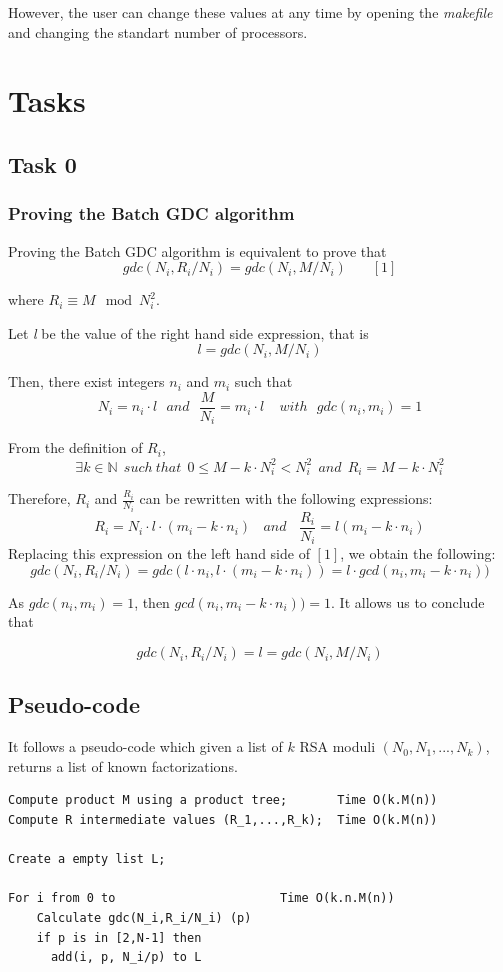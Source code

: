 \documentclass[a4paper,12pt]{article}
\begin{document}
However, the user can change these values at any time by opening the \textit{makefile} and changing the standart number of processors.

\section{Tasks}
\subsection{Task 0}

\subsubsection{Proving the Batch GDC algorithm}

Proving the Batch GDC algorithm is equivalent to prove that $$gdc(N_i,R_i/N_i) = gdc(N_i,M/N_i)~~~~~~~~[1]$$

where $R_i \equiv M\mod N_i^2$.

Let \textit{l} be the value of the right hand side expression, that is $$l = gdc(N_i,M/N_i)$$

Then, there exist integers $n_i$ and $m_i$ such that
$$N_i = n_i \cdot l ~~~ and~~~ \frac{M}{N_i} = m_i\cdot l ~~~~~ with~~~ gdc(n_i,m_i) = 1$$

From the definition of $R_i$,
$$ \exists k\in \mathbb{N} ~~such~ that~~ 0 \le M - k \cdot N_i^2 < N_i^2 ~~and ~~R_i = M - k \cdot N_i^2$$

Therefore, $R_i$ and $\frac{R_i}{N_i}$ can be rewritten with the following expressions:
$$ R_i = N_i \cdot l\cdot(m_i - k\cdot n_i) ~~~~ and ~~~~\frac{R_i}{N_i} = l(m_i- k\cdot n_i)$$
Replacing this expression on the left hand side of $[1]$, we obtain the following:
$$gdc(N_i,R_i/N_i) = gdc(l\cdot n_i, l\cdot(m_i - k\cdot n_i)) = l\cdot gcd(n_i,m_i-k\cdot n_i))$$

As $gdc(n_i,m_i) = 1$, then $gcd(n_i,m_i-k\cdot n_i)) = 1$. It allows us to conclude that

$$gdc(N_i,R_i/N_i) = l = gdc(N_i,M/N_i)$$

\subsection{Pseudo-code}
It follows a pseudo-code which given a list of $k$ RSA moduli $(N_0, N_1,..., N_k)$, returns a list of known factorizations.


\lstset{language=Pascal}        

\begin{lstlisting}[frame=single]  
Compute product M using a product tree;       Time O(k.M(n))
Compute R intermediate values (R_1,...,R_k);  Time O(k.M(n))

Create a empty list L;

For i from 0 to                       Time O(k.n.M(n))
    Calculate gdc(N_i,R_i/N_i) (p)     
    if p is in [2,N-1] then           
      add(i, p, N_i/p) to L            
\end{lstlisting}
\end{document}
